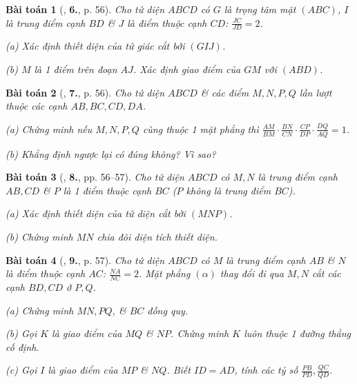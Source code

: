 \documentclass{article}
\numberwithin{equation}{section}
\newtheorem{baitoan}{Bài toán}[section]
\begin{document}
\begin{baitoan}[\cite{TL_chuyen_Toan_Hinh_Hoc_11}, \textbf{6.}, p. 56]
	Cho tứ diện $ABCD$ có $G$ là trọng tâm mặt $(ABC)$, $I$ là trung điểm cạnh $BD$ \& $J$ là điểm thuộc cạnh $CD$: $\frac{JC}{JD} = 2$.
	\begin{enumerate*}
		\item[(a)] Xác định thiết diện của tứ giác cắt bởi $(GIJ)$.
		\item[(b)] $M$ là 1 điểm trên đoạn $AJ$. Xác định giao điểm của $GM$ với $(ABD)$.
	\end{enumerate*}
\end{baitoan}

\begin{baitoan}[\cite{TL_chuyen_Toan_Hinh_Hoc_11}, \textbf{7.}, p. 56]
	Cho tứ diện $ABCD$ \& các điểm $M,N,P,Q$  lần lượt thuộc các cạnh $AB,BC,CD,DA$.
	\begin{enumerate*}
		\item[(a)] Chứng minh nếu $M,N,P,Q$ cùng thuộc 1 mặt phẳng thì $\frac{AM}{BM}\cdot\frac{BN}{CN}\cdot\frac{CP}{DP}\cdot\frac{DQ}{AQ} = 1$.
		\item[(b)] Khẳng định ngược lại có đúng không? Vì sao?
	\end{enumerate*}
\end{baitoan}

\begin{baitoan}[\cite{TL_chuyen_Toan_Hinh_Hoc_11}, \textbf{8.}, pp. 56--57]
	Cho tứ diện $ABCD$ có $M,N$ là trung điểm cạnh $AB,CD$ \& $P$ là 1 điểm thuộc cạnh $BC$ ($P$ không là trung điểm $BC$).
	\begin{enumerate*}
		\item[(a)] Xác định thiết diện của tứ diện cắt bởi $(MNP)$.
		\item[(b)] Chứng minh $MN$ chia đôi diện tích thiết diện.
	\end{enumerate*}
\end{baitoan}

\begin{baitoan}[\cite{TL_chuyen_Toan_Hinh_Hoc_11}, \textbf{9.}, p. 57]
	Cho tứ diện $ABCD$ có $M$ là trung điểm cạnh $AB$ \& $N$ là điểm thuộc cạnh $AC$: $\frac{NA}{NC} = 2$. Mặt phẳng $(\alpha)$ thay đổi đi qua $M,N$ cắt các cạnh $BD,CD$ ở $P,Q$.
	\begin{enumerate*}
		\item[(a)] Chứng minh $MN,PQ$, \& $BC$ đồng quy.
		\item[(b)] Gọi $K$ là giao điểm của $MQ$ \& $NP$. Chứng minh $K$ luôn thuộc 1 đường thẳng cố định.
		\item[(c)] Gọi $I$ là giao điểm của $MP$ \& $NQ$. Biết $ID = AD$, tính các tỷ số $\frac{PB}{PD},\frac{QC}{QD}$.
	\end{enumerate*}
\end{baitoan}
\end{document}
